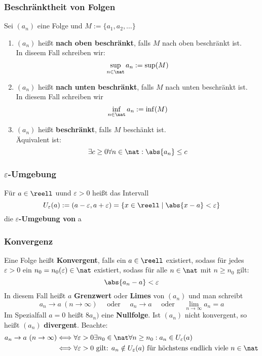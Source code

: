 \documentclass{kit}
\begin{document}
    \subsubsection{Beschränktheit von Folgen}
      Sei $(a_n)$ eine Folge und $M:=\{a_1,a_2,\dots\}$
      \begin{enumerate}
        \item $(a_n)$ heißt \textbf{nach oben beschränkt}, falls $M$ nach oben beschränkt ist.\\
          In diseem Fall schreiben wir:
          $$\sup_{n\in\nat}a_n:=\sup(M)$$
        \item $(a_n)$ heißt \textbf{nach unten beschränkt}, falls $M$ nach unten beschränkt ist.\\
          In diesem Fall schreiben wir
          $$\inf_{n\in\nat}a_n:=\inf(M)$$
        \item $(a_n)$ heißt \textbf{beschränkt}, falls $M$ beschänkt ist.\\
          Äquivalent ist:
          $$\exists c\ge0\forall n\in\nat:\abs{a_n}\le c$$
      \end{enumerate}
      \subsubsection{\texorpdfstring{$\varepsilon$}{}-Umgebung}
      Für $a\in\reell$ uund $\varepsilon>0$ heißt das Intervall
      $$U_\varepsilon(a):=(a-\varepsilon,a+\varepsilon)=\{x\in\reell\mid\abs{x-a}<\varepsilon\}$$
      die \textbf{$\varepsilon$-Umgebung von} a
    \subsubsection{Konvergenz}
      Eine Folge heißt \textbf{Konvergent}, falls ein $a\in\reell$ existiert, sodass für jedes $\varepsilon>0$ ein $n_0=n_0(\varepsilon)\in\nat$ existiert, sodass für alle $n\in\nat$ mit $n\ge n_0$ gilt:
      $$\abs{a_n-a}<\varepsilon$$
      In diesem Fall heißt $a$ \textbf{Grenzwert} oder \textbf{Limes} von $(a_n)$ und man schreibt
      $$a_n\longrightarrow a\ (n\rightarrow\infty)\quad \text{ oder }\quad a_n\rightarrow a\quad \text{ oder }\quad \lim_{n\rightarrow\infty}a_n=a$$
      Im Spezialfall $a=0$ heißt $8a_n)$ eine \textbf{Nullfolge}. Ist $(a_n)$ nicht konvergent, so heißt $(a_n)$ \textbf{divergent}. Beachte:
      \begin{align*}
        a_n\rightarrow a\ (n\rightarrow\infty) & \Longleftrightarrow\forall\varepsilon>0\exists n_0\in\nat\forall n\ge n_0:a_n\in U_\varepsilon(a)\\
         & \Longleftrightarrow\forall\varepsilon>0\text{ gilt: }a_n\notin U_\varepsilon(a)\text{ für höchstens endlich viele }n\in\nat
      \end{align*}
\end{document}
